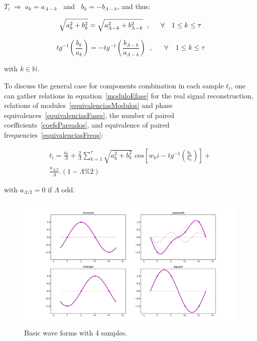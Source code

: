 $T_i \; \Rightarrow \; a_k = a_{\Lambda -k}\;\;$ and $\;\;b_k = - b_{\Lambda -k}$, and thus:

\begin{equation}\label{equivalenciasModulos}
\sqrt{a_k^2 + b_k^2} = \sqrt{a_{\Lambda - k}^2 + b_{\Lambda -k}^2} \;\;, \quad \;\; \forall \quad 1 \leq k \leq \tau  \\
\end{equation}

\begin{equation}\label{equivalenciasFases}
tg^{-1}\left(\frac{b_k}{a_k}\right)=-tg^{-1}\left(\frac{b_{\Lambda -k}}{a_{\Lambda - k}}\right)\;\;,\quad \;\; \forall \quad 1 \leq k \leq \tau
\end{equation}

with $k \in \mathbb{N}$.

To discuss the general case for components combination in each sample $t_i$, one can gather relations in equation~\ref{moduloEfase} for the real signal reconstruction, relations of modules~\ref{equivalenciasModulos} and phase equivalences~\ref{equivalenciasFases}, the number of paired coefficients~\ref{coefsPareados}, and equivalence of paired frequencies~\ref{equivalenciasFreqs}:

\begin{multline}\label{eq:reconsCompleta}
t_i = \frac{a_0}{\Lambda} + \frac{2}{\Lambda}\sum_{k=1}^{\tau}\sqrt{a_k^2 + b_k^2} \; cos\left[w_k i - tg^{-1}\left(\frac{b_k}{a_k}\right)\right]+ \\ \frac{ a_{\Lambda/2}}{\Lambda}.(1-\Lambda\% 2)
\end{multline}

with $a_{\Lambda/2}=0$ if $\Lambda$ odd.

\begin{figure}
    \centering
        \includegraphics[width=.9\textwidth]{figures/amostras4formas__}
    \caption{Basic wave forms with 4 samples.}
        \label{fig:formas4}
\end{figure}

